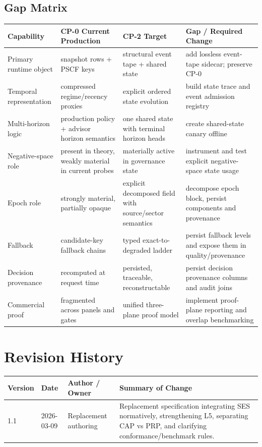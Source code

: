 \documentclass[11pt]{report}
\begin{document}
\section{Gap Matrix}
\begin{longtable}{p{}p{}p{}p{}}
\toprule
Capability & CP-0 Current Production & CP-2 Target & Gap / Required Change \\
\midrule
Primary runtime object & snapshot rows + PSCF keys & structural event tape + shared state & add lossless event-tape sidecar; preserve CP-0 \\
Temporal representation & compressed regime/recency proxies & explicit ordered state evolution & build state trace and event admission registry \\
Multi-horizon logic & production policy + advisor horizon semantics & one shared state with terminal horizon heads & create shared-state canary offline \\
Negative-space role & present in theory, weakly material in current probes & materially active in governance state & instrument and test explicit negative-space state usage \\
Epoch role & strongly material, partially opaque & explicit decomposed field with source/sector semantics & decompose epoch block, persist components and provenance \\
Fallback & candidate-key fallback chains & typed exact-to-degraded ladder & persist fallback levels and expose them in quality/provenance \\
Decision provenance & recomputed at request time & persisted, traceable, reconstructable & persist decision provenance columns and audit joins \\
Commercial proof & fragmented across panels and gates & unified three-plane proof model & implement proof-plane reporting and overlap benchmarking \\
\bottomrule
\end{longtable}

\chapter{Revision History}
\begin{longtable}{p{}p{}p{}p{}}
\toprule
Version & Date & Author / Owner & Summary of Change \\
\midrule
1.1 & 2026-03-09 & Replacement authoring & Replacement specification integrating SES normatively, strengthening L5, separating CAP vs PRP, and clarifying conformance/benchmark rules. \\
\bottomrule
\end{longtable}
\end{document}
